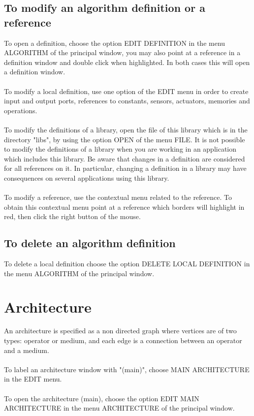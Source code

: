\documentclass[11pt,twoside]{report}
\begin{document}
\section{To modify an algorithm definition or a reference}
To open a definition, choose the
option EDIT DEFINITION in the menu ALGORITHM of the principal window,
you may also point at a reference in a definition window and double
click when highlighted. In both cases this will open a definition window.\\\\
To modify a local definition, use one option of the EDIT menu in order
to create input and output ports, references to constants, sensors, actuators, memories and operations.\\\\
To modify the definitions of a library, open the file of this
library which is in the directory "libs", by using the option OPEN of
the menu FILE. It is not possible to modify the definitions of a
library when you are working in an application which includes this
library. Be aware that changes in a definition are considered for all
references on it. In particular, changing a definition in a library
may have consequences on several applications using this library.\\\\
To modify a reference, use the contextual menu related
to the reference. To obtain this contextual menu point at a reference
which borders will highlight in red, then click the right button of the mouse.

\section{To delete an algorithm definition}
To delete a local definition choose the option DELETE LOCAL DEFINITION in the menu ALGORITHM of the principal window.

\chapter{Architecture}
An architecture is specified as a non directed graph where vertices are of
two types: operator or medium, and each edge is a connection between an
operator and a medium.\\\\ To label an architecture window with "(main)", choose MAIN
ARCHITECTURE in the EDIT menu.\\\\To open the architecture (main), choose the
option EDIT MAIN ARCHITECTURE in the menu ARCHITECTURE of the principal window.
\end{document}
